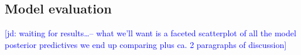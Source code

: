 \documentclass[10pt,letterpaper]{article}
\newcommand{\jd}[1]{\textcolor{Blue}{[jd: #1]}}
\newcommand{\denote}[1]{\mbox{ $[\![ #1 ]\!]$}}
\begin{document}
\subsection{Model evaluation}

\jd{waiting for results\dots -- what we'll want is a faceted scatterplot of all the model posterior predictives we end up comparing plus ca. 2 paragraphs of discussion}


%
%
\end{document}
